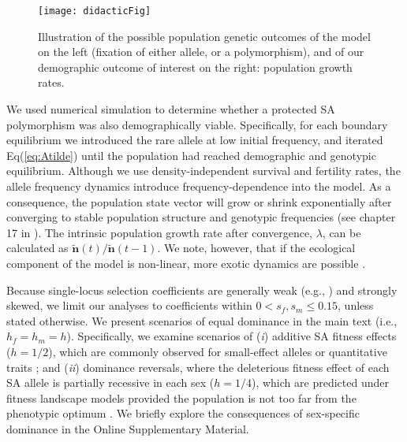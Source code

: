 \documentclass[11pt]{article}
\def\mbf#1{\mathbf{#1}}
\begin{document}
 \begin{figure}[htbp]
 \centering
 \texttt{[image: didacticFig]}
 \caption{\footnotesize{Illustration of the possible population genetic outcomes of the model on the left (fixation of either allele, or a polymorphism), and of our demographic outcome of interest on the right:  population growth rates.}}
 \label{fig:didactic}
 \end{figure}

We used numerical simulation to determine whether a protected SA polymorphism was also demographically viable. Specifically, for each boundary equilibrium we introduced the rare allele at low initial frequency, and iterated Eq(\ref{eq:Atilde}) until the population had reached demographic and genotypic equilibrium. Although we use density-independent survival and fertility rates, the allele frequency dynamics introduce frequency-dependence into the model. As a consequence, the population state vector will grow or shrink exponentially after converging to stable population structure and genotypic frequencies (see chapter 17 in \citealt{Caswell2001}). The intrinsic population growth rate after convergence, $\lambda$, can be calculated as $\tilde{\mbf{n}}(t)/\tilde{\mbf{n}}(t-1)$. We note, however, that if the ecological component of the model is non-linear, more exotic dynamics are possible \citep{de2020matrix}.


Because single-locus selection coefficients are generally weak (e.g., \citealt{Eyre-WalkerKeightly2007}) and strongly skewed, we limit our analyses to coefficients within $0 < s_f,s_m \leq 0.15$, unless stated otherwise. We present scenarios of equal dominance in the main text (i.e., $h_f = h_m = h$). Specifically, we examine scenarios of ({\itshape i}) additive SA fitness effects ($h = 1/2$), which are commonly observed for small-effect alleles or quantitative traits \citep{AgrawalWhitlock2011}; and ({\itshape ii}) dominance reversals, where the deleterious fitness effect of each SA allele is partially recessive in each sex ($h = 1/4$), which are predicted under fitness landscape models provided the population is not too far from the phenotypic optimum \citep{Manna2011, ConnallonClark2014}. We briefly explore the consequences of sex-specific dominance in the Online Supplementary Material.
\end{document}
